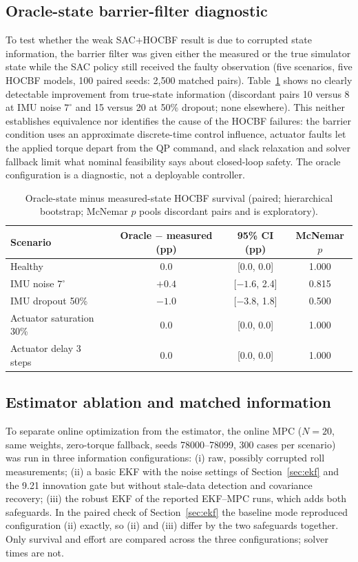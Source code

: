 \documentclass[preprint,12pt,authoryear=false]{elsarticle}
\theoremstyle{remark}\newtheorem{remark}{Remark}
\theoremstyle{plain}\newtheorem{proposition}{Proposition}\newtheorem{lemma}{Lemma}
\theoremstyle{definition}\newtheorem{assumption}{Assumption}
\begin{document}
\subsection{Oracle-state barrier-filter diagnostic}
To test whether the weak SAC+HOCBF result is due to corrupted state information, the barrier filter was given either the measured or the true simulator state while the SAC policy still received the faulty observation (five scenarios, five HOCBF models, 100 paired seeds: 2{,}500 matched pairs). Table~\ref{tab:oracle} shows no clearly detectable improvement from true-state information (discordant pairs 10 versus 8 at IMU noise $7^\circ$ and 15 versus 20 at 50\% dropout; none elsewhere). This neither establishes equivalence nor identifies the cause of the HOCBF failures: the barrier condition uses an approximate discrete-time control influence, actuator faults let the applied torque depart from the QP command, and slack relaxation and solver fallback limit what nominal feasibility says about closed-loop safety. The oracle configuration is a diagnostic, not a deployable controller.

\begin{table}[t]\centering\small
\caption{Oracle-state minus measured-state HOCBF survival (paired; hierarchical bootstrap; McNemar $p$ pools discordant pairs and is exploratory).}\label{tab:oracle}
\begin{tabular}{lccc}\toprule
Scenario & Oracle $-$ measured (pp) & 95\% CI (pp) & McNemar $p$\\\midrule
Healthy & 0.0 & [0.0, 0.0] & 1.000\\
IMU noise $7^\circ$ & $+0.4$ & [$-1.6$, 2.4] & 0.815\\
IMU dropout 50\% & $-1.0$ & [$-3.8$, 1.8] & 0.500\\
Actuator saturation 30\% & 0.0 & [0.0, 0.0] & 1.000\\
Actuator delay 3 steps & 0.0 & [0.0, 0.0] & 1.000\\\bottomrule
\end{tabular}
\end{table}

\subsection{Estimator ablation and matched information}\label{sec:ablation}
To separate online optimization from the estimator, the online MPC ($N=20$, same weights, zero-torque fallback, seeds 78000--78099, 300 cases per scenario) was run in three information configurations: (i) raw, possibly corrupted roll measurements; (ii) a basic EKF with the noise settings of Section~\ref{sec:ekf} and the 9.21 innovation gate but without stale-data detection and covariance recovery; (iii) the robust EKF of the reported EKF--MPC runs, which adds both safeguards. In the paired check of Section~\ref{sec:ekf} the baseline mode reproduced configuration (ii) exactly, so (ii) and (iii) differ by the two safeguards together. Only survival and effort are compared across the three configurations; solver times are not.
\end{document}
